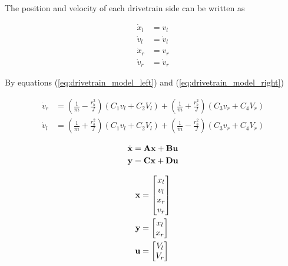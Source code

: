 The position and velocity of each drivetrain side can be written as

\begin{align}
  \dot{x}_l &= v_l \label{eq:drivetrain_cont_ss_posl} \\
  \dot{v}_l &= \dot{v}_l \label{eq:drivetrain_cont_ss_vell} \\
  \dot{x}_r &= v_r \label{eq:drivetrain_cont_ss_posr} \\
  \dot{v}_r &= \dot{v}_r \label{eq:drivetrain_cont_ss_velr}
\end{align}

By equations (\ref{eq:drivetrain_model_left}) and
(\ref{eq:drivetrain_model_right})

\begin{align*}
  \dot{v}_r &= \left(\frac{1}{m} - \frac{r_b^2}{J}\right)
    \left(C_1 v_l + C_2 V_l\right) +
    \left(\frac{1}{m} + \frac{r_b^2}{J}\right) \left(C_3 v_r + C_4 V_r\right)
    \\
  \dot{v}_l &= \left(\frac{1}{m} + \frac{r_b^2}{J}\right)
    \left(C_1 v_l + C_2 V_l\right) +
    \left(\frac{1}{m} - \frac{r_b^2}{J}\right) \left(C_3 v_r + C_4 V_r\right)
\end{align*}

\begin{align*}
  \dot{\mathbf{x}} &= \mathbf{A} \mathbf{x} + \mathbf{B} \mathbf{u} \\
  \mathbf{y} &= \mathbf{C} \mathbf{x} + \mathbf{D} \mathbf{u}
\end{align*}

\begin{align*}
  \mathbf{x} &=
  \begin{bmatrix}
    x_l \\
    v_l \\
    x_r \\
    v_r
  \end{bmatrix} \\
  \mathbf{y} &=
  \begin{bmatrix}
    x_l \\
    x_r
  \end{bmatrix} \\
  \mathbf{u} &=
  \begin{bmatrix}
    V_l \\
    V_r
  \end{bmatrix}
\end{align*}

